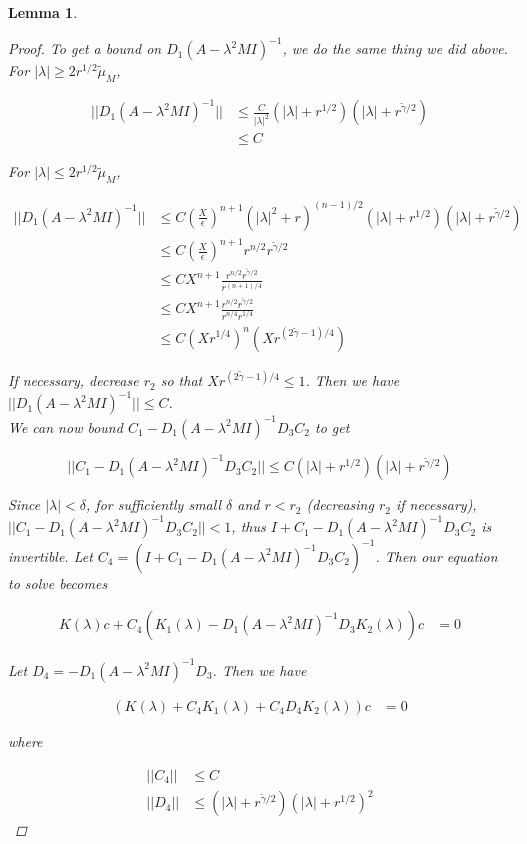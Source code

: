 \documentclass[12pt]{article}
\newtheorem{lemma}{Lemma}
\begin{document}
\begin{lemma}
\begin{proof}
To get a bound on $D_1 (A - \lambda^2 MI)^{-1}$, we do the same thing we did above. For $|\lambda| \geq 2 r^{1/2} \tilde{\mu}_M$,

\begin{align*}
|| D_1 (A - \lambda^2 MI)^{-1} || &\leq \frac{C}{|\lambda|^2} (|\lambda| + r^{1/2}) (|\lambda| + r^{\tilde{\gamma}/2}) \\ 
&\leq C
\end{align*}

For $|\lambda| \leq 2 r^{1/2} \tilde{\mu}_M$,

\begin{align*}
|| D_1 (A - \lambda^2 MI)^{-1} || &\leq C \left(\frac{X}{\epsilon}\right)^{n+1}\left( |\lambda|^2 + r \right)^{(n-1)/2} (|\lambda| + r^{1/2}) (|\lambda| + r^{\tilde{\gamma}/2}) \\
&\leq C \left(\frac{X}{\epsilon}\right)^{n+1} r^{n/2} r^{\tilde{\gamma}/2} \\
&\leq C X^{n+1} \frac{ r^{n/2} r^{\tilde{\gamma}/2} }{ r^{(n+1)/4} } \\
&\leq C X^{n+1} \frac{ r^{n/2} r^{\tilde{\gamma}/2} }{ r^{n/4}r^{1/4} } \\
&\leq C (X r^{1/4})^n (X r^{(2 \tilde{\gamma} - 1)/4})
\end{align*}

If necessary, decrease $r_2$ so that $X r^{(2 \tilde{\gamma} - 1)/4} \leq 1$. Then we have $|| D_1 (A - \lambda^2 MI)^{-1} || \leq C$.\\

We can now bound $C_1 - D_1 (A - \lambda^2 MI)^{-1} D_3 C_2$ to get

\[
|| C_1 - D_1 (A - \lambda^2 MI)^{-1} D_3 C_2 || \leq C (|\lambda| + r^{1/2})(|\lambda| + r^{\tilde{\gamma}/2})
\]

Since $|\lambda| < \delta$, for sufficiently small $\delta$ and $r < r_2$ (decreasing $r_2$ if necessary), $|| C_1 - D_1 (A - \lambda^2 MI)^{-1} D_3 C_2 || < 1$, thus $I + C_1 - D_1 (A - \lambda^2 MI)^{-1} D_3 C_2$ is invertible. Let $C_4 = (I + C_1 - D_1 (A - \lambda^2 MI)^{-1} D_3 C_2)^{-1}$. Then our equation to solve becomes

\begin{align*}
K(\lambda)c + C_4(K_1(\lambda) - D_1 (A - \lambda^2 MI)^{-1} D_3 K_2(\lambda))c &= 0
\end{align*}

Let $D_4 = -D_1 (A - \lambda^2 MI)^{-1} D_3$. Then we have

\begin{align*}
(K(\lambda) + C_4 K_1(\lambda) + C_4 D_4 K_2(\lambda))c &= 0
\end{align*}

where

\begin{align*}
||C_4|| &\leq C \\
||D_4|| &\leq (|\lambda| + r^{\tilde{\gamma}/2})(|\lambda| + r^{1/2})^2
\end{align*}

\end{proof}
\end{lemma}
\end{document}
